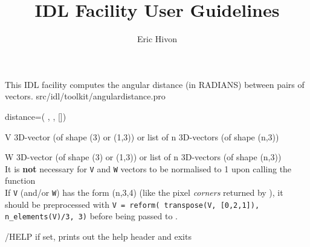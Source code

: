 

\sloppy

\title{\healpix IDL Facility User Guidelines}
 \section[angulardistance]{ }
\label{idl:angulardistance}
\author{Eric Hivon}

\begin{facility}
{This IDL facility computes the angular distance (in RADIANS) between pairs of vectors.
}
{src/idl/toolkit/angulardistance.pro}
\end{facility}

\begin{IDLformat}
{%
{distance}=\thedocid(%
, 
,
[])}
\end{IDLformat}

\begin{qualifiers}
  \begin{qulist}{} %
    \item[V] %
      3D-vector (of shape (3) or (1,3)) or list of n 3D-vectors (of shape (n,3))
    \item[W] %
      3D-vector (of shape (3) or (1,3)) or list of n 3D-vectors (of shape
(n,3))\\
	It is {\bf not} necessary for {\tt V} and {\tt W} vectors to be normalised to 1
        upon calling the function\\
If {\tt V} (and/or {\tt W}) has the form (n,3,4) (like the pixel {\em corners} returned by
 ), it should be preprocessed with
 {\tt V = reform( transpose(V, [0,2,1]), n\_elements(V)/3, 3)}
  before being passed to \thedocid.  
\end{qulist}
\end{qualifiers}

\begin{keywords}
  \begin{kwlist}{} %
    \item[/HELP] %
	if set, prints out the help header and exits
  \end{kwlist}
\end{keywords}  

